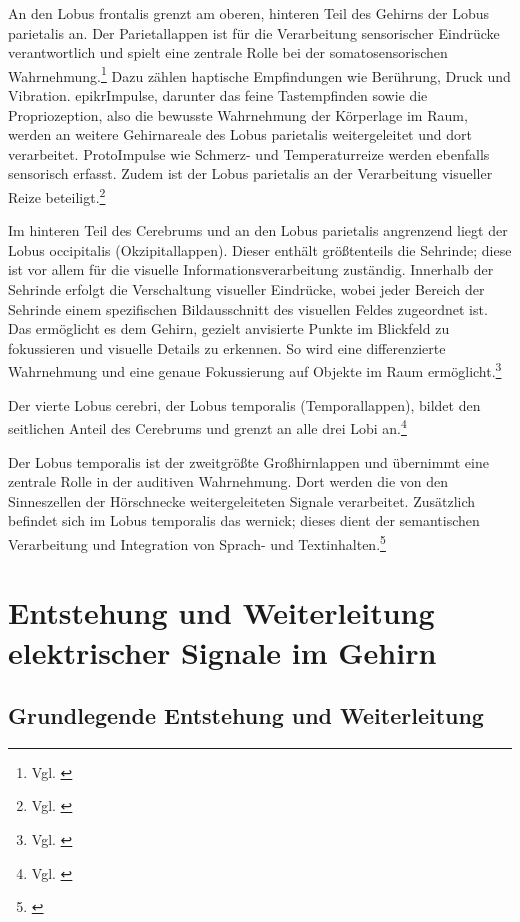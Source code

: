 An den Lobus frontalis grenzt am oberen, hinteren Teil des Gehirns der Lobus parietalis an. Der Parietallappen ist für die Verarbeitung sensorischer Eindrücke verantwortlich und spielt eine zentrale Rolle bei der somatosensorischen Wahrnehmung.\footnote{Vgl. \cite{javed2023_cortex}} Dazu zählen haptische Empfindungen wie Berührung, Druck und Vibration. \gls{epikrImpulse}, darunter das feine Tastempfinden sowie die Propriozeption, also die bewusste Wahrnehmung der Körperlage im Raum, werden an weitere Gehirnareale des Lobus parietalis weitergeleitet und dort verarbeitet. \gls{ProtoImpulse} wie Schmerz- und Temperaturreize werden ebenfalls sensorisch erfasst. Zudem ist der Lobus parietalis an der Verarbeitung visueller Reize beteiligt.\footnote{Vgl. \cite{javed2023_cortex}}

Im hinteren Teil des Cerebrums und an den Lobus parietalis angrenzend liegt der Lobus occipitalis (Okzipitallappen). Dieser enthält größtenteils die Sehrinde; diese ist vor allem für die visuelle Informationsverarbeitung zuständig. Innerhalb der Sehrinde erfolgt die Verschaltung visueller Eindrücke, wobei jeder Bereich der Sehrinde einem spezifischen Bildausschnitt des visuellen Feldes zugeordnet ist. Das ermöglicht es dem Gehirn, gezielt anvisierte Punkte im Blickfeld zu fokussieren und visuelle Details zu erkennen. So wird eine differenzierte Wahrnehmung und eine genaue Fokussierung auf Objekte im Raum ermöglicht.\footnote{Vgl. \cite{rehman2023_occipital}}

Der vierte Lobus cerebri, der Lobus temporalis (Temporallappen), bildet den seitlichen Anteil des Cerebrums und grenzt an alle drei Lobi an.\footnote{Vgl. \cite{kenhub_temporallappen}}

Der Lobus temporalis ist der zweitgrößte Großhirnlappen und übernimmt eine zentrale Rolle in der auditiven Wahrnehmung. Dort werden die von den Sinneszellen der Hörschnecke weitergeleiteten Signale verarbeitet. Zusätzlich befindet sich im Lobus temporalis das \gls{wernick}; dieses dient \glqq der semantischen Verarbeitung und Integration von Sprach- und Textinhalten\grqq{}.\footnote{\cite{doccheck_wernicke}}

\section{Entstehung und Weiterleitung elektrischer Signale im Gehirn}

\subsection{Grundlegende Entstehung und Weiterleitung}
\label{sec:entstehung}


